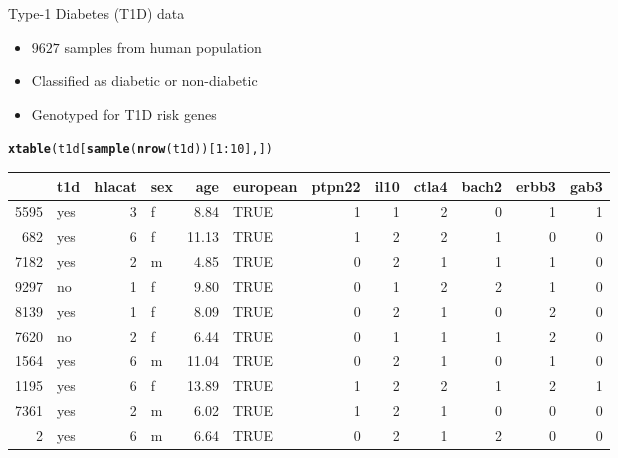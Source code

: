 \documentclass{beamer}\usepackage[]{graphicx}\usepackage[]{color}
\makeatletter
\newcommand{\hlnum}[1]{\textcolor[rgb]{0.686,0.059,0.569}{#1}}%
\newcommand{\hlopt}[1]{\textcolor[rgb]{0,0,0}{#1}}%
\newcommand{\hlstd}[1]{\textcolor[rgb]{0.345,0.345,0.345}{#1}}%
\newcommand{\hlkwd}[1]{\textcolor[rgb]{0.737,0.353,0.396}{\textbf{#1}}}%
\newenvironment{kframe}{%
 \def\at@end@of@kframe{}%
 \ifinner\ifhmode%
  \def\at@end@of@kframe{\end{minipage}}%
  \begin{minipage}{\columnwidth}%
 \fi\fi%
 \def\FrameCommand##1{\hskip\@totalleftmargin \hskip-\fboxsep
 \colorbox{shadecolor}{##1}\hskip-\fboxsep
     \hskip-\linewidth \hskip-\@totalleftmargin \hskip\columnwidth}%
 \MakeFramed {\advance\hsize-\width
   \@totalleftmargin\z@ \linewidth\hsize
   \@setminipage}}%
 {\par\unskip\endMakeFramed%
 \at@end@of@kframe}
\makeatother
\begin{document}
\begin{frame}{Type-1 Diabetes (T1D) data}
  \begin{itemize}
    \item $9627$ samples from human population
    \item Classified as diabetic or non-diabetic
    \item Genotyped for T1D risk genes
  \end{itemize}
  \tiny
\begin{kframe}
\begin{alltt}
\hlkwd{xtable}\hlstd{(t1d[}\hlkwd{sample}\hlstd{(}\hlkwd{nrow}\hlstd{(t1d))[}\hlnum{1}\hlopt{:}\hlnum{10}\hlstd{],])}
\end{alltt}
\end{kframe}%
\begin{table}[ht]
\centering
\begin{tabular}{rlrlrlrrrrrr}
  \hline
 & t1d & hlacat & sex & age & european & ptpn22 & il10 & ctla4 & bach2 & erbb3 & gab3 \\ 
  \hline
5595 & yes &   3 & f & 8.84 & TRUE &   1 &   1 &   2 &   0 &   1 &   1 \\ 
  682 & yes &   6 & f & 11.13 & TRUE &   1 &   2 &   2 &   1 &   0 &   0 \\ 
  7182 & yes &   2 & m & 4.85 & TRUE &   0 &   2 &   1 &   1 &   1 &   0 \\ 
  9297 & no &   1 & f & 9.80 & TRUE &   0 &   1 &   2 &   2 &   1 &   0 \\ 
  8139 & yes &   1 & f & 8.09 & TRUE &   0 &   2 &   1 &   0 &   2 &   0 \\ 
  7620 & no &   2 & f & 6.44 & TRUE &   0 &   1 &   1 &   1 &   2 &   0 \\ 
  1564 & yes &   6 & m & 11.04 & TRUE &   0 &   2 &   1 &   0 &   1 &   0 \\ 
  1195 & yes &   6 & f & 13.89 & TRUE &   1 &   2 &   2 &   1 &   2 &   1 \\ 
  7361 & yes &   2 & m & 6.02 & TRUE &   1 &   2 &   1 &   0 &   0 &   0 \\ 
  2 & yes &   6 & m & 6.64 & TRUE &   0 &   2 &   1 &   2 &   0 &   0 \\ 
   \hline
\end{tabular}
\end{table}

\end{frame}
\end{document}
